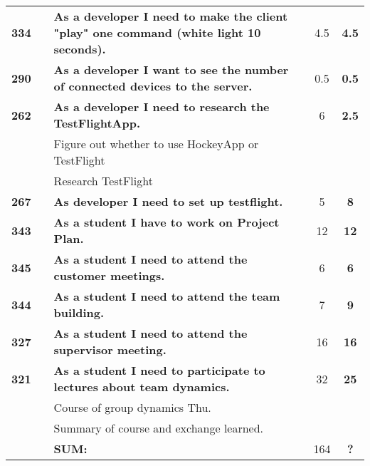\begin{longtable}{ccXcc}
\textbf{334} 	& {M6}
	& {\bf As a developer I need to make the client "play" one command (white light 10 seconds). } 	& 		4.5	& \textbf{4.5} \\

\textbf{290} 	& {M3}
	& {\bf As a developer I want to see the number of connected devices to the server. } 	& 		0.5	& \textbf{0.5} \\

\textbf{262} 	&& {\bf As a developer I need to research the TestFlightApp. } 	& 		6	& \textbf{2.5} \\
				&& Figure out whether to use HockeyApp or TestFlight&  &  \\
				&& Research TestFlight	&  &  \\
\textbf{267} 	&& {\bf As developer I need to set up testflight. } 	& 		5	& \textbf{8} \\

\midrule
\textbf{343} 	&& {\bf As a student I have to work on Project Plan.} 	& 		12	& \textbf{12} \\
				
\midrule
\textbf{345} 	&& {\bf As a student I need to attend the customer meetings.} 	& 		6	& \textbf{6} \\

\textbf{344} 	&& {\bf As a student I need to attend the team building.} 	& 		7	& \textbf{9} \\
		
\textbf{327} 	&& {\bf As a student I need to attend the supervisor meeting. } 	& 		16	& \textbf{16} \\

\textbf{321} 	&& {\bf As a student I need to participate to lectures about team dynamics. } 	& 		32	& \textbf{25} \\
				&& Course of group dynamics Thu.	&  &  \\
				&& Summary of course and exchange learned.	&  &  \\
				

				
\hline
				&& \textbf{SUM:}		&		164	& \textbf{?}
 \\																			
\bottomrule[1mm]
\end{longtable}
